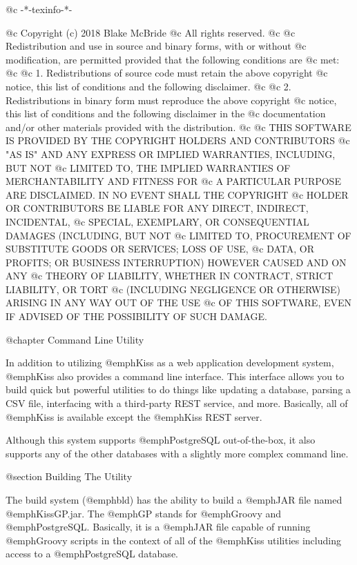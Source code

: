 @c -*-texinfo-*-

@c  Copyright (c) 2018 Blake McBride
@c  All rights reserved.
@c
@c  Redistribution and use in source and binary forms, with or without
@c  modification, are permitted provided that the following conditions are
@c  met:
@c
@c  1. Redistributions of source code must retain the above copyright
@c  notice, this list of conditions and the following disclaimer.
@c
@c  2. Redistributions in binary form must reproduce the above copyright
@c  notice, this list of conditions and the following disclaimer in the
@c  documentation and/or other materials provided with the distribution.
@c
@c  THIS SOFTWARE IS PROVIDED BY THE COPYRIGHT HOLDERS AND CONTRIBUTORS
@c  "AS IS" AND ANY EXPRESS OR IMPLIED WARRANTIES, INCLUDING, BUT NOT
@c  LIMITED TO, THE IMPLIED WARRANTIES OF MERCHANTABILITY AND FITNESS FOR
@c  A PARTICULAR PURPOSE ARE DISCLAIMED. IN NO EVENT SHALL THE COPYRIGHT
@c  HOLDER OR CONTRIBUTORS BE LIABLE FOR ANY DIRECT, INDIRECT, INCIDENTAL,
@c  SPECIAL, EXEMPLARY, OR CONSEQUENTIAL DAMAGES (INCLUDING, BUT NOT
@c  LIMITED TO, PROCUREMENT OF SUBSTITUTE GOODS OR SERVICES; LOSS OF USE,
@c  DATA, OR PROFITS; OR BUSINESS INTERRUPTION) HOWEVER CAUSED AND ON ANY
@c  THEORY OF LIABILITY, WHETHER IN CONTRACT, STRICT LIABILITY, OR TORT
@c  (INCLUDING NEGLIGENCE OR OTHERWISE) ARISING IN ANY WAY OUT OF THE USE
@c  OF THIS SOFTWARE, EVEN IF ADVISED OF THE POSSIBILITY OF SUCH DAMAGE.


@chapter Command Line Utility

In addition to utilizing @emph{Kiss} as a web application development
system, @emph{Kiss} also provides a command line interface.  This interface
allows you to build quick but powerful utilities to do things like updating
a database, parsing a CSV file, interfacing with a third-party REST service,
and more.  Basically, all of @emph{Kiss} is available except the @emph{Kiss}
REST server.

Although this system supports @emph{PostgreSQL} out-of-the-box, it
also supports any of the other databases with a slightly more complex
command line.

@section Building The Utility

The build system (@emph{bld}) has the ability to build a @emph{JAR}
file named @emph{KissGP.jar}.  The @emph{GP} stands for @emph{Groovy}
and @emph{PostgreSQL}.  Basically, it is a @emph{JAR} file capable of
running @emph{Groovy} scripts in the context of all of the @emph{Kiss}
utilities including access to a @emph{PostgreSQL} database.

